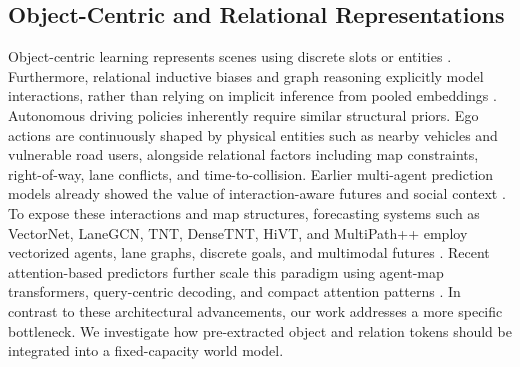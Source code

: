 \documentclass[10pt,journal,compsoc]{IEEEtran}
\begin{document}
\subsection{Object-Centric and Relational Representations}
Object-centric learning represents scenes using discrete slots or entities \cite{greff2019multiobject,locatello2020slotattention}. Furthermore, relational inductive biases and graph reasoning explicitly model interactions, rather than relying on implicit inference from pooled embeddings \cite{santoro2017relation,battaglia2018relational,kipf2018nri}. Autonomous driving policies inherently require similar structural priors. Ego actions are continuously shaped by physical entities such as nearby vehicles and vulnerable road users, alongside relational factors including map constraints, right-of-way, lane conflicts, and time-to-collision. Earlier multi-agent prediction models already showed the value of interaction-aware futures and social context \cite{gupta2018socialgan,ivanovic2019trajectron,rhinehart2019precog,salzmann2020trajectronpp}. To expose these interactions and map structures, forecasting systems such as VectorNet, LaneGCN, TNT, DenseTNT, HiVT, and MultiPath++ employ vectorized agents, lane graphs, discrete goals, and multimodal futures \cite{gao2020vectornet,liang2020lanegcn,zhao2021tnt,gu2021densetnt,zhou2022hivt,varadarajan2022multipathpp}. Recent attention-based predictors further scale this paradigm using agent-map transformers, query-centric decoding, and compact attention patterns \cite{yuan2021agentformer,ngiam2022scene,shi2022mtr,nayakanti2023wayformer,zhou2023qcnet}. In contrast to these architectural advancements, our work addresses a more specific bottleneck. We investigate how pre-extracted object and relation tokens should be integrated into a fixed-capacity world model.

\end{document}
